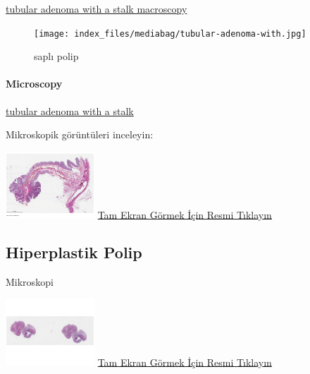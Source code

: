 \documentclass[
  letterpaper,
  DIV=11,
  numbers=noendperiod]{scrreprt}
\let\oldparagraph\paragraph
\renewcommand{\paragraph}[1]{\oldparagraph{#1}\mbox{}}
\begin{document}
\href{https://images.patolojiatlasi.com/tubularadenoma/tubular-adenoma-with-stalk-macroscopy.jpg}{tubular
adenoma with a stalk macroscopy}

\begin{figure}

{\centering \texttt{[image: index\_files/mediabag/tubular-adenoma-with.jpg]}

}

\caption{saplı polip}

\end{figure}

\hypertarget{microscopy}{%
\paragraph{Microscopy}\label{microscopy}}

\href{https://images.patolojiatlasi.com/tubularadenoma/tubular-adenoma-with-stalk.jpeg}{tubular
adenoma with a stalk}

Mikroskopik görüntüleri inceleyin:

\href{https://images.patolojiatlasi.com/tubularadenoma/tubular-adenoma-with-stalk/viewer_z0.html}{\includegraphics[width=0.25\textwidth,height=\textheight]{./screenshots/thumbnail_tubular-adenoma-with-stalk.png}}
\href{https://images.patolojiatlasi.com/tubularadenoma/tubular-adenoma-with-stalk/viewer_z0.html}{Tam
Ekran Görmek İçin Resmi Tıklayın}

\hypertarget{sec-kolon-hiperplastik-polip}{%
\subsection{Hiperplastik Polip}\label{sec-kolon-hiperplastik-polip}}

Mikroskopi

\href{https://images.patolojiatlasi.com/hyperplasticpolyp/case1.html}{\includegraphics[width=0.25\textwidth,height=\textheight]{./screenshots/thumbnail_hyperplasticpolyp-1.png}}
\href{https://images.patolojiatlasi.com/hyperplasticpolyp/case1.html}{Tam
Ekran Görmek İçin Resmi Tıklayın}
\end{document}
